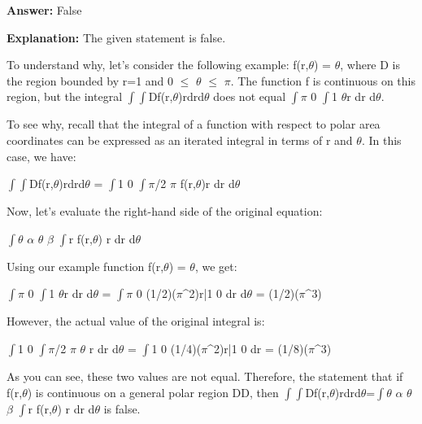 \documentclass{article}
\begin{document}
                \textbf{Answer:} False

                \textbf{Explanation:} The given statement is false.

To understand why, let's consider the following example: f(r,\ensuremath{\theta}) = \ensuremath{\theta}, where D is the region bounded by r=1 and 0 \ensuremath{\leq} \ensuremath{\theta} \ensuremath{\leq} \ensuremath{\pi}. The function f is continuous on this region, but the integral \ensuremath{\int}\ensuremath{\int}Df(r,\ensuremath{\theta})rdrd\ensuremath{\theta} does not equal \ensuremath{\int}\ensuremath{\pi} 0 \ensuremath{\int}1 \ensuremath{\theta}r dr d\ensuremath{\theta}.

To see why, recall that the integral of a function with respect to polar area coordinates can be expressed as an iterated integral in terms of r and \ensuremath{\theta}. In this case, we have:

\ensuremath{\int}\ensuremath{\int}Df(r,\ensuremath{\theta})rdrd\ensuremath{\theta} = \ensuremath{\int}1 0 \ensuremath{\int}\ensuremath{\pi}/2 \ensuremath{\pi} f(r,\ensuremath{\theta})r dr d\ensuremath{\theta}

Now, let's evaluate the right-hand side of the original equation:

\ensuremath{\int}\ensuremath{\theta} \ensuremath{\alpha} \ensuremath{\theta} \ensuremath{\beta} \ensuremath{\int}r f(r,\ensuremath{\theta}) r dr d\ensuremath{\theta}

Using our example function f(r,\ensuremath{\theta}) = \ensuremath{\theta}, we get:

\ensuremath{\int}\ensuremath{\pi} 0 \ensuremath{\int}1 \ensuremath{\theta}r dr d\ensuremath{\theta} = \ensuremath{\int}\ensuremath{\pi} 0 (1/2)(\ensuremath{\pi}{\textasciicircum}2)r|1 0 dr d\ensuremath{\theta}
= (1/2)(\ensuremath{\pi}{\textasciicircum}3)

However, the actual value of the original integral is:

\ensuremath{\int}1 0 \ensuremath{\int}\ensuremath{\pi}/2 \ensuremath{\pi} \ensuremath{\theta} r dr d\ensuremath{\theta} = \ensuremath{\int}1 0 (1/4)(\ensuremath{\pi}{\textasciicircum}2)r|1 0 dr
= (1/8)(\ensuremath{\pi}{\textasciicircum}3)

As you can see, these two values are not equal. Therefore, the statement that if f(r,\ensuremath{\theta}) is continuous on a general polar region DD, then \ensuremath{\int}\ensuremath{\int}Df(r,\ensuremath{\theta})rdrd\ensuremath{\theta}=\ensuremath{\int}\ensuremath{\theta} \ensuremath{\alpha} \ensuremath{\theta} \ensuremath{\beta} \ensuremath{\int}r f(r,\ensuremath{\theta}) r dr d\ensuremath{\theta} is false.
                
\end{document}
